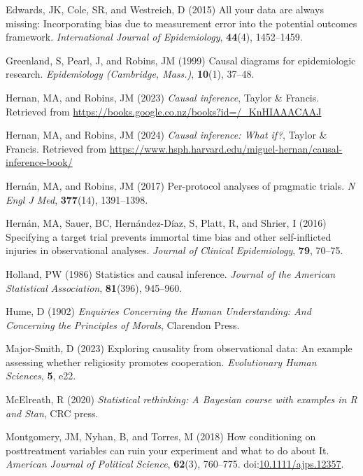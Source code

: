 \documentclass[
  singlecolumn]{article}
\newlength{\cslhangindent}
\newenvironment{CSLReferences}[2] %
 {\begin{list}{}{%
  \setlength{\itemindent}{0pt}
  \setlength{\leftmargin}{0pt}
  \setlength{\parsep}{0pt}
  \ifodd #1
   \setlength{\leftmargin}{\cslhangindent}
   \setlength{\itemindent}{-1\cslhangindent}
  \fi
  \setlength{\itemsep}{#2\baselineskip}}}
 {\end{list}}
\begin{document}
\begin{CSLReferences}{1}{0}
Edwards, JK, Cole, SR, and Westreich, D (2015) All your data are always
missing: Incorporating bias due to measurement error into the potential
outcomes framework. \emph{International Journal of Epidemiology},
\textbf{44}(4), 1452--1459.

Greenland, S, Pearl, J, and Robins, JM (1999) Causal diagrams for
epidemiologic research. \emph{Epidemiology (Cambridge, Mass.)},
\textbf{10}(1), 37--48.

Hernan, MA, and Robins, JM (2023) \emph{Causal inference}, Taylor \&
Francis. Retrieved from
\url{https://books.google.co.nz/books?id=/_KnHIAAACAAJ}

Hernan, MA, and Robins, JM (2024) \emph{Causal inference: What if?},
Taylor \& Francis. Retrieved from
\url{https://www.hsph.harvard.edu/miguel-hernan/causal-inference-book/}

Hernán, MA, and Robins, JM (2017) Per-protocol analyses of pragmatic
trials. \emph{N Engl J Med}, \textbf{377}(14), 1391--1398.

Hernán, MA, Sauer, BC, Hernández-Díaz, S, Platt, R, and Shrier, I (2016)
Specifying a target trial prevents immortal time bias and other
self-inflicted injuries in observational analyses. \emph{Journal of
Clinical Epidemiology}, \textbf{79}, 70--75.

Holland, PW (1986) Statistics and causal inference. \emph{Journal of the
American Statistical Association}, \textbf{81}(396), 945--960.

Hume, D (1902) \emph{Enquiries Concerning the Human Understanding: And
Concerning the Principles of Morals}, Clarendon Press.

Major-Smith, D (2023) Exploring causality from observational data: An
example assessing whether religiosity promotes cooperation.
\emph{Evolutionary Human Sciences}, \textbf{5}, e22.

McElreath, R (2020) \emph{Statistical rethinking: A {B}ayesian course
with examples in {R} and {S}tan}, CRC press.

Montgomery, JM, Nyhan, B, and Torres, M (2018) How conditioning on
posttreatment variables can ruin your experiment and what to do about
It. \emph{American Journal of Political Science}, \textbf{62}(3),
760--775.
doi:\href{https://doi.org/10.1111/ajps.12357}{10.1111/ajps.12357}.


\end{CSLReferences}
\end{document}
